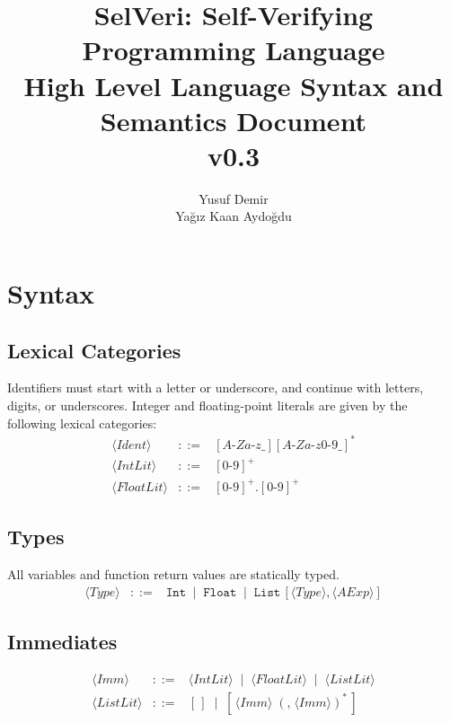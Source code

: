 \documentclass{article}
\title{SelVeri: Self-Verifying Programming Language \\ High Level Language Syntax and Semantics Document \\ v0.3}
\author{Yusuf Demir \\ Yağız Kaan Aydoğdu}
\begin{document}
\maketitle


\newpage
\section{Syntax}

\subsection{Lexical Categories}

Identifiers must start with a letter or underscore, and continue with letters, digits, or underscores.
Integer and floating-point literals are given by the following lexical categories:
\[
\begin{array}{rcl}
\langle \mathit{Ident} \rangle &::=& [A\texttt{-}Za\texttt{-}z\_][A\texttt{-}Za\texttt{-}z0\texttt{-}9\_]^* \\
\langle \mathit{IntLit} \rangle &::=& [0\texttt{-}9]^+ \\
\langle \mathit{FloatLit} \rangle &::=& [0\texttt{-}9]^+\texttt{.}[0\texttt{-}9]^+
\end{array}
\]

\subsection{Types}

All variables and function return values are statically typed.
\[
\begin{array}{rcl}
\langle \mathit{Type} \rangle
&::=&
\mathtt{Int}
\;\mid\;
\mathtt{Float}
\;\mid\;
\mathtt{List}\,[\langle \mathit{Type} \rangle,\langle \mathit{AExp} \rangle]
\end{array}
\]

\subsection{Immediates}

\[
\begin{array}{rcl}
\langle \mathit{Imm} \rangle
&::=&
\langle \mathit{IntLit} \rangle
\;\mid\;
\langle \mathit{FloatLit} \rangle
\;\mid\;
\langle \mathit{ListLit} \rangle \\[4pt]

\langle \mathit{ListLit} \rangle
&::=&
[\,]
\;\mid\;
[\,\langle \mathit{Imm} \rangle\;(\texttt{,}\;\langle \mathit{Imm} \rangle)^*\,]
\end{array}
\]
\end{document}
